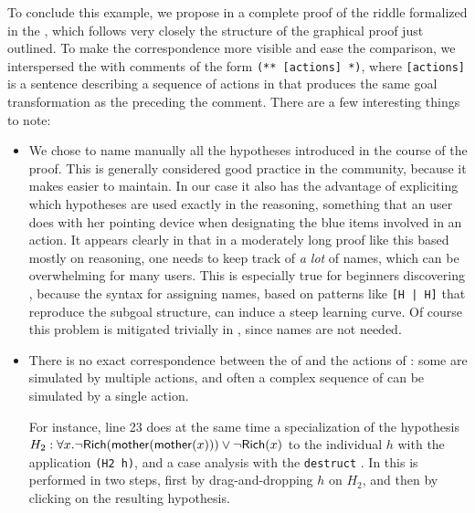 To conclude this example, we propose in  a complete proof of
the riddle formalized in the  , which follows very closely the
structure of the graphical proof just outlined. To make the correspondence more
visible and ease the comparison, we interspersed the  with comments
of the form \texttt{(** [actions] *)}, where \texttt{[actions]} is a
sentence describing a sequence of actions in  that produces the same goal
transformation as the  preceding the comment. There are a few interesting
things to note:
\begin{itemize}
  \item We chose to name manually all the hypotheses introduced in the course of
  the proof. This is generally considered good practice in the  community,
  because it makes  easier to maintain. In our case it also has the
  advantage of expliciting which hypotheses are used exactly in the reasoning,
  something that an  user does with her pointing device when designating
  the blue items involved in an action. It appears clearly in
   that in a moderately long proof like this based mostly on
   reasoning, one needs to keep track of \emph{a lot} of names, which can
  be overwhelming for many users. This is especially true for beginners
  discovering , because the syntax for assigning names, based on patterns
  like \texttt{[H | H]} that reproduce the subgoal structure, can induce a steep
  learning curve. Of course this problem is mitigated trivially in , since
  names are not needed.

  \item There is no exact correspondence between the  of  and the
  actions of : some  are simulated by multiple actions, and often a
  complex sequence of  can be simulated by a single action.
  
  For instance, line 23 does at the same time a specialization of the hypothesis
  $H_2 : \forall x. \neg \mbox{\textsf{Rich}}(\mbox{\textsf{mother}}(\mbox{\textsf{mother}}(x))) \lor \neg \mbox{\textsf{Rich}}(x)$ to the
  individual $h$ with the application \texttt{(H2 h)}, and a case analysis with
  the \texttt{destruct} . In  this is performed in two steps, first
  by drag-and-dropping $h$ on $H_2$, and then by clicking on the resulting
  hypothesis.


\end{itemize}
